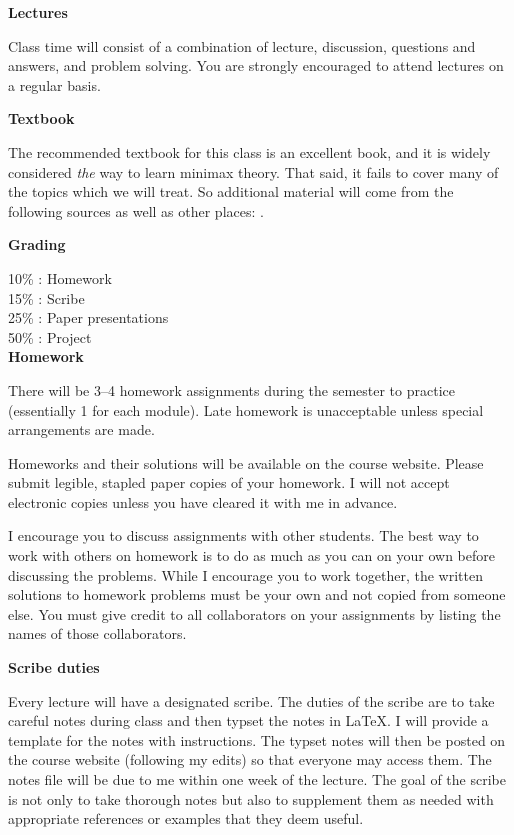\documentclass[10pt]{article}
\begin{document}
{\bf Lectures}

Class time will consist of a
combination of lecture, discussion, questions and answers, and problem
solving. You are strongly encouraged to attend lectures on a regular
basis. 

{\bf Textbook}

The recommended textbook for this class is an excellent book, and it
is widely considered {\em the} way to learn minimax theory. That said,
it fails to cover many of the topics which we will treat. So
additional material will come from the following sources as well as
other places:
\citet{vanweak,DevroyeGyorfi2013,
  Vapnik1998,Geer2000}. 

\clearpage

{\bf Grading}

10\% : Homework\\
15\% : Scribe\\
25\% : Paper presentations\\
50\% : Project\\


{\bf Homework}

There will be 3--4 homework assignments during the semester to
  practice (essentially 1 for each module). Late homework is 
  unacceptable unless special arrangements are made. 

Homeworks and their solutions will be available on the course
  website. Please submit legible, stapled paper copies of your
  homework. I will not accept electronic copies unless you have
  cleared it with me in advance.

I encourage you to discuss
  assignments with other students.  The best way to work with others
  on homework is to do as much as you can on your own before
  discussing the problems. While I encourage you to work together, the
  written solutions to homework problems must be your own and not
  copied from someone else. You must give credit to all collaborators
  on your assignments by listing the names of those collaborators.

{\bf Scribe duties}

Every lecture will have a designated scribe. The duties of the scribe
are to take careful notes during class and then typset the notes in
\LaTeX. I will provide a template for the notes with instructions. The
typset notes will then be posted on the course website (following my
edits) so that everyone may access them. The notes file will be due to
me within one week of the lecture. The goal of the scribe is not only
to take thorough notes but also to supplement them as needed with
appropriate references or examples that they deem useful. 
\end{document}
